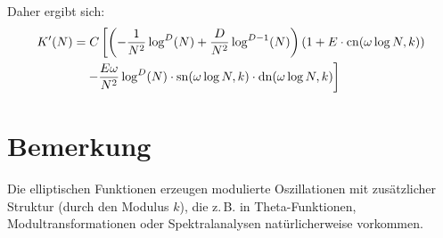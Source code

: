 \documentclass[a4paper,12pt]{article}
\begin{document}
Daher ergibt sich:
\begin{align}
K'(N) &= C \left[ \left( -\frac{1}{N^2} \log^D(N) + \frac{D}{N^2} \log^{D-1}(N) \right) \left( 1 + E \cdot \mathrm{cn}(\omega \log N, k) \right) \right. \notag \\
&\quad\left. - \frac{E \omega}{N^2} \log^D(N) \cdot \mathrm{sn}(\omega \log N, k) \cdot \mathrm{dn}(\omega \log N, k) \right]
\end{align}

\section*{Bemerkung}

Die elliptischen Funktionen erzeugen modulierte Oszillationen mit zusätzlicher Struktur (durch den Modulus \( k \)), die z.\,B. in Theta-Funktionen, Modultransformationen oder Spektralanalysen natürlicherweise vorkommen.
\end{document}
